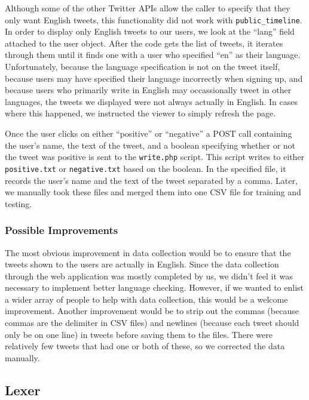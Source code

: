 \documentclass[12pt,a4paper]{article}
\begin{document}
Although some of the other Twitter APIs allow the caller to specify that they only want English tweets, this functionality did not work with \texttt{public\_timeline}. In order to display only English tweets to our users, we look at the ``lang'' field attached to the user object. After the code gets the list of tweets, it iterates through them until it finds one with a user who specified ``en'' as their language. Unfortunately, because the language specification is not on the tweet itself, because users may have specified their language incorrectly when signing up, and because users who primarily write in English may occassionally tweet in other languages, the tweets we displayed were not always actually in English. In cases where this happened, we instructed the viewer to simply refresh the page.

Once the user clicks on either ``positive'' or ``negative'' a POST call containing the user’s name, the text of the tweet, and a boolean specifying whether or not the tweet was positive is sent to the \texttt{write.php} script. This script writes to either \texttt{positive.txt} or \texttt{negative.txt} based on the boolean. In the specified file, it records the user’s name and the text of the tweet separated by a comma. Later, we manually took these files and merged them into one CSV file for training and testing.

\subsubsection{Possible Improvements}

The most obvious improvement in data collection would be to ensure that the tweets shown to the users are actually in English. Since the data collection through the web application was mostly completed by us, we didn’t feel it was necessary to implement better language checking. However, if we wanted to enlist a wider array of people to help with data collection, this would be a welcome improvement. Another improvement would be to strip out the commas (because commas are the delimiter in CSV files) and newlines (because each tweet should only be on one line) in tweets before saving them to the files. There were relatively few tweets that had one or both of these, so we corrected the data manually.

\subsection { Lexer }
\end{document}
